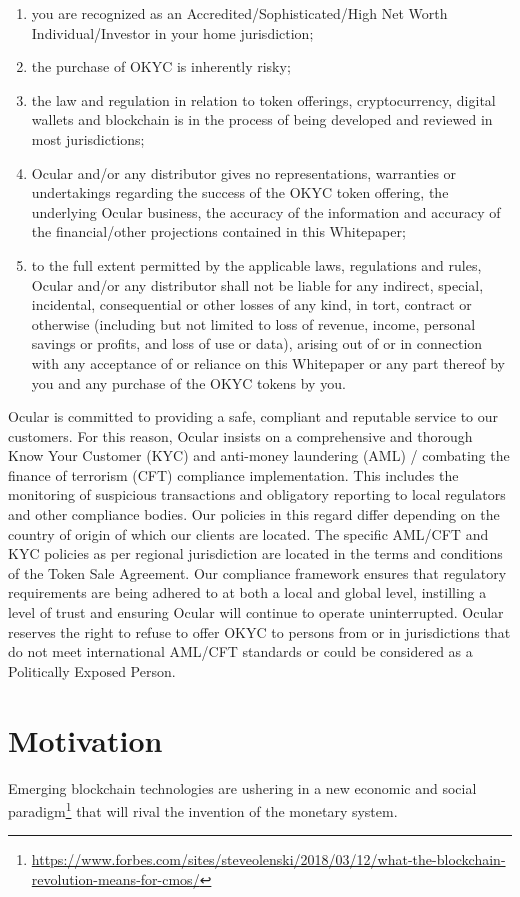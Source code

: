 \documentclass[a4paper]{article}
\begin{document}
\begin{enumerate}
\item you are recognized as an Accredited/Sophisticated/High Net Worth Individual/Investor in your home jurisdiction; 
\item the purchase of OKYC is inherently risky; 
\item the law and regulation in relation to token offerings, cryptocurrency, digital wallets and blockchain is in the process of being developed and reviewed in most jurisdictions;
\item Ocular and/or any distributor gives no representations, warranties or undertakings regarding the success of the OKYC token offering, the underlying Ocular business, the accuracy of the information and accuracy of the financial/other projections contained in this Whitepaper;
\item to the full extent permitted by the applicable laws, regulations and rules, Ocular and/or any distributor shall not be liable for any indirect, special, incidental, consequential or other losses of any kind, in tort, contract or otherwise (including but not limited to loss of revenue, income, personal savings or profits, and loss of use or data), arising out of or in connection with any acceptance of or reliance on this Whitepaper or any part thereof by you and any purchase of the OKYC tokens by you.
\end{enumerate}

Ocular is committed to providing a safe, compliant and reputable service to our customers. For this reason, Ocular insists on a comprehensive and thorough Know Your Customer (KYC) and anti-money laundering (AML) / combating the finance of terrorism (CFT) compliance implementation. This includes the monitoring of suspicious transactions and obligatory reporting to local regulators and other compliance bodies. Our policies in this regard differ depending on the country of origin of which our clients are located. The specific AML/CFT and KYC policies as per regional jurisdiction are located in the terms and conditions of the Token Sale Agreement. Our compliance framework ensures that regulatory requirements are being adhered to at both a local and global level, instilling a level of trust and ensuring Ocular will continue to operate uninterrupted. Ocular reserves the right to refuse to offer OKYC to persons from or in jurisdictions that do not meet international AML/CFT standards or could be considered as a Politically Exposed Person.
\clearpage
\section{Motivation}
Emerging blockchain technologies are ushering in a new economic and social paradigm\footnote{\url{https://www.forbes.com/sites/steveolenski/2018/03/12/what-the-blockchain-revolution-means-for-cmos/}} that will rival the invention of the monetary system. 
\end{document}
